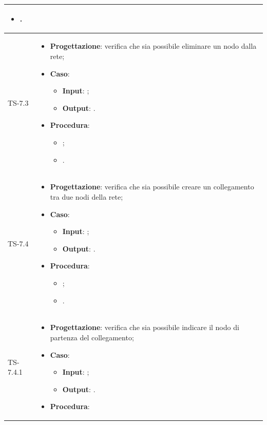 \begin{longtable}{|C{2.5cm}|C{13cm}|}
\begin{itemize}
\begin{itemize}
		\item .
	\end{itemize} 
\end{itemize}
	 \\
	\hline
	{TS-7.3} &
\begin{itemize}
	\item \textbf{Progettazione}: verifica che sia possibile eliminare un
	nodo dalla rete;
	\item \textbf{Caso}: 
	\begin{itemize}
		\item \textbf{Input}: ;
		\item \textbf{Output}: .
	\end{itemize}
	\item \textbf{Procedura}:
	\begin{itemize}
		\item ;
		\item .
	\end{itemize} 
\end{itemize}
	  \\
	\hline
	{TS-7.4} & 
\begin{itemize}
	\item \textbf{Progettazione}: verifica che sia possibile creare un
	collegamento tra due nodi della rete;
	\item \textbf{Caso}: 
	\begin{itemize}
		\item \textbf{Input}: ;
		\item \textbf{Output}: .
	\end{itemize}
	\item \textbf{Procedura}:
	\begin{itemize}
		\item ;
		\item .
	\end{itemize} 
\end{itemize}
	  \\
	\hline
	{TS-7.4.1} & 
\begin{itemize}
	\item \textbf{Progettazione}: verifica che sia possibile indicare il nodo
	di partenza del collegamento;
	\item \textbf{Caso}: 
	\begin{itemize}
		\item \textbf{Input}: ;
		\item \textbf{Output}: .
	\end{itemize}
	\item \textbf{Procedura}:

\end{itemize}
\end{longtable}
